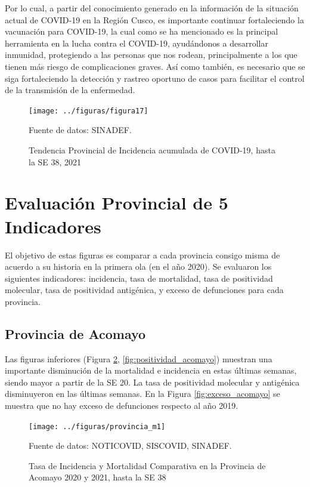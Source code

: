 \documentclass[12pt,a4paper,openany]{book}
\begin{document}
	Por lo cual, a partir del conocimiento generado en la información de la situación actual de COVID-19 en la Región Cusco, es importante continuar fortaleciendo la vacunación para COVID-19, la cual como se ha mencionado es la principal herramienta en la lucha contra el COVID-19, ayudándonos a desarrollar inmunidad, protegiendo a las personas que nos rodean, principalmente a los que tienen más riesgo de complicaciones graves. Así como también, es necesario que se siga fortaleciendo la detección y rastreo oportuno de casos para facilitar el control de la transmisión de la enfermedad.
	

	
	\begin{figure}[h]
		\caption{Tendencia Provincial de Incidencia acumulada de COVID-19, hasta la SE 38, 2021}\label{fig:mortalidad_provincias}
		\begin{center}
			\texttt{[image: ../figuras/figura17]}
		\end{center}
		{\footnotesize {Fuente de datos: SINADEF.}}
	\end{figure}
	
	\newpage
	
	\section*{Evaluación Provincial de 5 Indicadores}
	\noindent El objetivo de estas figuras es comparar a cada provincia consigo misma de acuerdo a su historia  en la primera ola (en el año 2020). Se evaluaron los siguientes indicadores: incidencia, tasa de mortalidad, tasa de positividad molecular, tasa de positividad antigénica, y exceso de defunciones para cada provincia.
	
	\subsection*{Provincia de Acomayo}
	\noindent Las figuras inferiores (Figura \ref{fig:inc_mort_acomayo}, \ref{fig:positividad_acomayo}) muestran una importante disminución de la mortalidad e incidencia en estas últimas semanas, siendo mayor a partir de la SE 20. La tasa de positividad molecular y antigénica disminuyeron en las últimas semanas. En la Figura \ref{fig:exceso_acomayo} se muestra que no hay exceso de defunciones respecto al año 2019.
	
	\begin{figure}[h]
		\caption{Tasa de Incidencia y Mortalidad Comparativa en la Provincia de Acomayo 2020 y 2021, hasta la SE 38}\label{fig:inc_mort_acomayo}
		\begin{center}
			\texttt{[image: ../figuras/provincia\_m1]}
		\end{center}
		{\footnotesize {Fuente de datos: NOTICOVID, SISCOVID, SINADEF.}}
	\end{figure}
\end{document}
